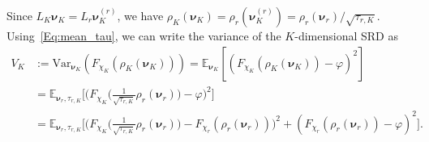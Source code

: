 \documentclass[%
onefignum,onetabnum]{siamonline250211}
\newcommand{\bbE}{\mathbb E}
\begin{document}
Since $L_K\boldsymbol{\nu}_K=L_r\boldsymbol{\nu}_K^{(r)}$, we have
$    \rho_K(\boldsymbol{\nu}_K)=\rho_r(\boldsymbol{\nu}_K^{(r)})=\rho_r(\boldsymbol{\nu}_r)/{\sqrt{\tau_{r,K}}}$.
Using~\eqref{Eq:mean_tau}, we can write the variance of the $K$-dimensional SRD as
\begin{equation}\label{Eq:var_SRD_K}
    \begin{aligned}
        V_K &:= \mathrm{Var}_{\boldsymbol{\nu}_K} \left( F_{\chi_K}(\rho_K(\boldsymbol{\nu}_K)) \right)
        = \bbE_{\boldsymbol{\nu}_K} \left[\left( F_{\chi_K}(\rho_K(\boldsymbol{\nu}_K))-\varphi \right)^2\right] \\
        &= \bbE_{\boldsymbol{\nu}_r,\tau_{r,K}} \bigg[\Big( F_{\chi_K}\Big( \frac{1}{\sqrt{\tau_{r,K}}}\rho_r(\boldsymbol{\nu}_r) \Big)-\varphi \Big)^2\bigg] \\
        &= \bbE_{\boldsymbol{\nu}_r,\tau_{r,K}} \bigg[ \Big( F_{\chi_K}\Big( \frac{1}{\sqrt{\tau_{r,K}}}\rho_r(\boldsymbol{\nu}_r) \Big)-F_{\chi_r}(\rho_r(\boldsymbol{\nu}_r)) \Big)^2 + (F_{\chi_r}(\rho_r(\boldsymbol{\nu}_r))-\varphi)^2 \bigg].
    \end{aligned}
\end{equation}
\end{document}
